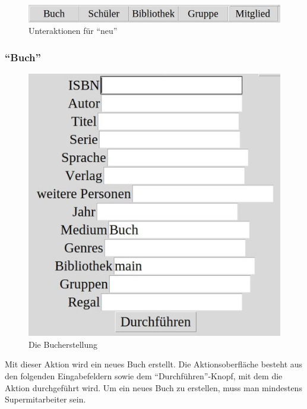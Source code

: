 \begin{figure}\includegraphics{images/gui2/new_menu.jpg}\caption{Unteraktionen für ``neu''}\label{fig:new_menu}\end{figure}

\subsubsection{``Buch''}
\label{subsubsec:detail:new:book}
\begin{figure}\includegraphics{images/gui2/new_book.jpg}\caption{Die Bucherstellung}\label{fig:new_book}\end{figure}

Mit dieser Aktion wird ein neues Buch erstellt. Die Aktionsoberfläche besteht aus den folgenden Eingabefeldern sowie dem ``Durchführen''-Knopf, mit dem die Aktion durchgeführt wird.
Um ein neues Buch zu erstellen, muss man mindestens Supermitarbeiter sein.

